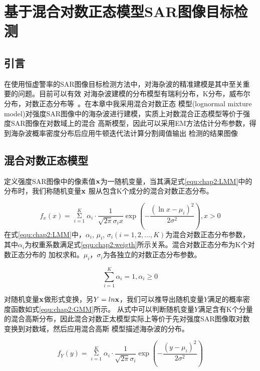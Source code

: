 \chapter{基于混合对数正态模型SAR图像目标检测}
\label{cha:LMM}

\section{引言}
\label{sec:chap2:sec1}
在使用恒虚警率的SAR图像目标检测方法中，对海杂波的精准建模是其中至关重要的问题。目前可以有效
对海杂波建模的分布模型有瑞利分布，K分布，威布尔分布，对数正态分布等~\cite{Carretero2010Statistical}。在本章中我采用混合对数正态
模型(lognormal mixture model)对强度SAR图像中的海杂波进行建模，实质上对数混合正态模型等价于强度SAR图像在对数域上的混合
高斯模型\cite{838811}，因此可以采用EM方法估计分布参数，得到海杂波概率密度分布后应用牛顿迭代法计算分割阈值输出
检测的结果图像


\section{混合对数正态模型}
\label{sec:chap2:sec2}
  定义强度SAR图像中的像素值$\bf{x}$为一随机变量，当其满足式\ref{equ:chap2:LMM}中的分布时，我们称随机变量$\bf{x}$
  服从包含K个成分的混合对数正态分布。

    \begin{equation}
      \label{equ:chap2:LMM}
      {f_x}(x) = \mathop \Sigma \limits_{i = 1}^K {\alpha _i} \cdot \frac{1}{{\sqrt {2\pi } {\sigma _i}x}}\exp ( - \frac{{{{(\ln x - {\mu _i})}^2}}}{{2{\sigma ^2}}}),x > 0
    \end{equation}
  在式\ref{equ:chap2:LMM}中，$\alpha_i$, $\mu_i$, $\sigma_i(i=1,2,...,K)$为混合对数正态分布参数，
  其中$\alpha_i$为权重系数满足式\ref{equ:chap2:weigth}所示关系。混合对数正态分布为K个对数正态分布的
  加权求和。$\mu_i$，$\sigma_i$为各独立的对数正态分布参数。

    \begin{equation}
      \label{equ:chap2:weigth}
      \sum\limits_{i = 1}^K {{\alpha _i} = 1,{\alpha _i} \ge 0} 
    \end{equation}

  对随机变量$\bf{x}$做形式变换，另$Y=ln\bf{x}$，我们可以推导出随机变量$Y$满足的概率密度函数如式\ref{equ:chap2:GMM}所示。
  从式中可以判断随机变量$Y$满足含有K个分量的混合高斯分布，因此混合对数正太模型实际上等价于先对强度SAR图像取对数变换到对数域，然后应用混合高斯
  模型描述海杂波的分布。

    \begin{equation}
      \label{equ:chap2:GMM}
        {f_Y}(y) = \mathop \Sigma \limits_{i = 1}^K {\alpha _i} \cdot \frac{1}{{\sqrt {2\pi } {\sigma _i}}}\exp ( - \frac{{{{(y - {\mu _i})}^2}}}{{2{\sigma ^2}}})
    \end{equation}


